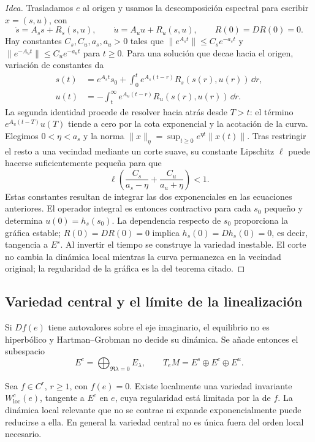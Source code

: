 \begin{proof}[Idea]
Trasladamos \(e\) al origen y usamos la descomposición espectral para
escribir \(x=(s,u)\), con
\[
 \dot s=A_ss+R_s(s,u),\qquad
 \dot u=A_uu+R_u(s,u),\qquad R(0)=DR(0)=0.
\]
Hay constantes \(C_s,C_u,a_s,a_u>0\) tales que
\(\|e^{A_st}\|\le C_se^{-a_st}\) y
\(\|e^{-A_ut}\|\le C_ue^{-a_ut}\) para \(t\ge0\).
Para una solución que decae hacia el origen, variación de constantes da
\begin{align*}
 s(t)&=e^{A_st}s_0+\int_0^te^{A_s(t-r)}R_s(s(r),u(r))\,\dd r,\\
 u(t)&=-\int_t^\infty e^{A_u(t-r)}R_u(s(r),u(r))\,\dd r.
\end{align*}
La segunda identidad procede de resolver hacia atrás desde \(T>t\):
el término \(e^{A_u(t-T)}u(T)\) tiende a cero por la cota exponencial
y la acotación de la curva. Elegimos \(0<\eta<a_s\) y la norma
\(\|x\|_\eta=\sup_{t\ge0}e^{\eta t}\|x(t)\|\). Tras restringir el
resto a una vecindad mediante un corte suave, su constante Lipschitz
\(\ell\) puede hacerse suficientemente pequeña para que
\[
 \ell\left(\frac{C_s}{a_s-\eta}+\frac{C_u}{a_u+\eta}\right)<1.
\]
Estas constantes resultan de integrar las dos exponenciales en las
ecuaciones anteriores. El operador integral es entonces contractivo para
cada \(s_0\) pequeño y determina \(u(0)=h_s(s_0)\).
La dependencia respecto de \(s_0\) proporciona la gráfica estable;
\(R(0)=DR(0)=0\) implica \(h_s(0)=Dh_s(0)=0\), es decir, tangencia
a \(E^s\). Al invertir el tiempo se construye la variedad inestable.
El corte no cambia la dinámica local mientras la curva permanezca en la
vecindad original; la regularidad de la gráfica es la del teorema citado.
\end{proof}



\subsection{Variedad central y el límite de la linealización}

Si \(Df(e)\) tiene autovalores sobre el eje imaginario, el equilibrio no es
hiperbólico y Hartman--Grobman no decide su dinámica. Se añade entonces el
subespacio
\begin{equation}
 E^c=\bigoplus_{\Re\lambda=0}E_\lambda,\qquad
 T_eM=E^s\oplus E^c\oplus E^u.
 \label{geo:eq:center-splitting}
\end{equation}

\begin{proposition}
Sea \(f\in C^r\), \(r\ge1\), con \(f(e)=0\). Existe localmente una variedad
invariante \(W^c_{\mathrm{loc}}(e)\), tangente a \(E^c\) en \(e\), cuya
regularidad está limitada por la de \(f\). La dinámica local relevante que no
se contrae ni expande exponencialmente puede reducirse a ella. En general la
variedad central no es única fuera del orden local necesario.
\end{proposition}

